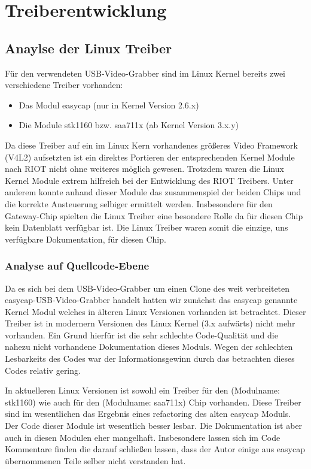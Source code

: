 \section{Treiberentwicklung}
\subsection{Anaylse der Linux Treiber}
Für den verwendeten USB-Video-Grabber sind im Linux Kernel bereits zwei 
verschiedene Treiber vorhanden:
\begin{itemize}
 \item Das Modul easycap (nur in Kernel Version 2.6.x)
 \item Die Module stk1160 bzw. saa711x (ab Kernel Version 3.x.y)
\end{itemize}
Da diese Treiber auf ein im Linux Kern 
vorhandenes größeres Video Framework (V4L2) aufsetzten ist ein direktes Portieren der 
entsprechenden Kernel Module nach RIOT nicht ohne weiteres möglich gewesen.
Trotzdem waren die Linux Kernel Module extrem hilfreich bei der Entwicklung
des RIOT Treibers. Unter anderem konnte anhand dieser Module das zusammenspiel
der beiden Chips und die korrekte Ansteuerung selbiger ermittelt werden.
Insbesondere für den Gateway-Chip \stk{} spielten die Linux Treiber eine
besondere Rolle da für diesen Chip kein Datenblatt verfügbar ist. Die Linux 
Treiber waren somit die einzige, uns verfügbare Dokumentation, für diesen Chip. 

\subsubsection{Analyse auf Quellcode-Ebene}
Da es sich bei dem USB-Video-Grabber um einen Clone des weit verbreiteten
easycap-USB-Video-Grabber handelt hatten wir zunächst das easycap genannte Kernel
Modul welches in älteren Linux Versionen vorhanden ist betrachtet. Dieser Treiber
ist in modernern Versionen des Linux Kernel (3.x aufwärts) nicht mehr vorhanden.
Ein Grund hierfür ist die sehr schlechte Code-Qualität und die nahezu
nicht vorhandene Dokumentation dieses Moduls. Wegen der schlechten Lesbarkeits des
Codes war der Informationsgewinn durch das betrachten dieses Codes relativ gering.

In aktuelleren Linux Versionen ist sowohl ein Treiber für den \stk{} (Modulname: stk1160) 
wie auch für den \saa{} (Modulname: saa711x) Chip vorhanden. Diese Treiber sind im wesentlichen 
das Ergebnis eines refactoring des alten easycap Moduls. Der Code dieser Module ist wesentlich 
besser lesbar. Die Dokumentation ist aber auch in diesen Modulen eher mangelhaft. Insbesondere 
lassen sich im Code Kommentare finden die darauf schließen lassen, dass der Autor einige aus easycap übernommenen Teile selber nicht verstanden hat.

